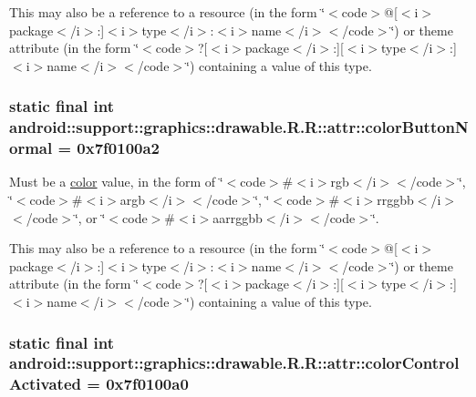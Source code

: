 This may also be a reference to a resource (in the form \char`\"{}$<$code$>$@\mbox{[}$<$i$>$package$<$/i$>$:\mbox{]}$<$i$>$type$<$/i$>$:$<$i$>$name$<$/i$>$$<$/code$>$\char`\"{}) or theme attribute (in the form \char`\"{}$<$code$>$?\mbox{[}$<$i$>$package$<$/i$>$:\mbox{]}\mbox{[}$<$i$>$type$<$/i$>$:\mbox{]}$<$i$>$name$<$/i$>$$<$/code$>$\char`\"{}) containing a value of this type. \hypertarget{classandroid_1_1support_1_1graphics_1_1drawable_1_1_r_1_1attr_bc7e2061713883bbee5a4d651a63cb81}{
\subsubsection[{colorButtonNormal}]{\setlength{\rightskip}{0pt plus 5cm}static final int android::support::graphics::drawable.R.R::attr::colorButtonNormal = 0x7f0100a2}}
\label{classandroid_1_1support_1_1graphics_1_1drawable_1_1_r_1_1attr_bc7e2061713883bbee5a4d651a63cb81}


Must be a \hyperlink{classandroid_1_1support_1_1graphics_1_1drawable_1_1_r_1_1color}{color} value, in the form of \char`\"{}$<$code$>$\#$<$i$>$rgb$<$/i$>$$<$/code$>$\char`\"{}, \char`\"{}$<$code$>$\#$<$i$>$argb$<$/i$>$$<$/code$>$\char`\"{}, \char`\"{}$<$code$>$\#$<$i$>$rrggbb$<$/i$>$$<$/code$>$\char`\"{}, or \char`\"{}$<$code$>$\#$<$i$>$aarrggbb$<$/i$>$$<$/code$>$\char`\"{}. 

This may also be a reference to a resource (in the form \char`\"{}$<$code$>$@\mbox{[}$<$i$>$package$<$/i$>$:\mbox{]}$<$i$>$type$<$/i$>$:$<$i$>$name$<$/i$>$$<$/code$>$\char`\"{}) or theme attribute (in the form \char`\"{}$<$code$>$?\mbox{[}$<$i$>$package$<$/i$>$:\mbox{]}\mbox{[}$<$i$>$type$<$/i$>$:\mbox{]}$<$i$>$name$<$/i$>$$<$/code$>$\char`\"{}) containing a value of this type. \hypertarget{classandroid_1_1support_1_1graphics_1_1drawable_1_1_r_1_1attr_2a9465dcf1800883aac9756586c27198}{
\subsubsection[{colorControlActivated}]{\setlength{\rightskip}{0pt plus 5cm}static final int android::support::graphics::drawable.R.R::attr::colorControlActivated = 0x7f0100a0}}
\label{classandroid_1_1support_1_1graphics_1_1drawable_1_1_r_1_1attr_2a9465dcf1800883aac9756586c27198}



